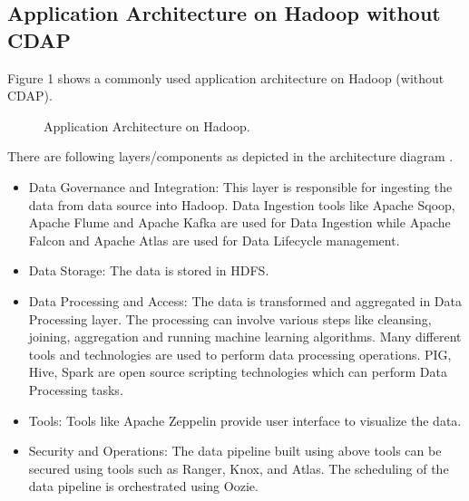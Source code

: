 \documentclass[9pt,twocolumn,twoside]{styles/osajnl}
\begin{document}
\subsection{Application Architecture on Hadoop without CDAP}
Figure 1 \cite{www-hdp-dataplatform} shows a commonly used application
architecture on Hadoop (without CDAP).


\begin{figure}[htbp]
\centering
{}
\caption{Application Architecture on Hadoop.}
\label{fig:hadoop-arch}
\end{figure}

There are following layers/components as depicted in the architecture diagram
\cite{www-hdp-dataplatform}.

\begin{itemize}
\item Data Governance and Integration: This layer is responsible for ingesting
the data from data source into Hadoop. Data Ingestion tools like Apache
Sqoop, Apache Flume and Apache Kafka are used for Data Ingestion while Apache
Falcon and Apache Atlas are used for Data Lifecycle management.
\item Data Storage: The data is stored in HDFS.
\item Data Processing and Access: The data is transformed and aggregated in
Data Processing layer. The processing can involve various steps like cleansing,
joining, aggregation and running machine learning algorithms. Many different
tools and technologies are used to perform data processing operations.
PIG, Hive, Spark are open source scripting technologies which can perform
Data Processing tasks.
\item Tools: Tools like Apache Zeppelin provide user interface to visualize
the data.
\item Security and Operations: The data pipeline built using above tools can
 be secured using tools such as Ranger, Knox, and Atlas. The scheduling of
 the data pipeline is orchestrated using Oozie.
\end{itemize}
\end{document}
